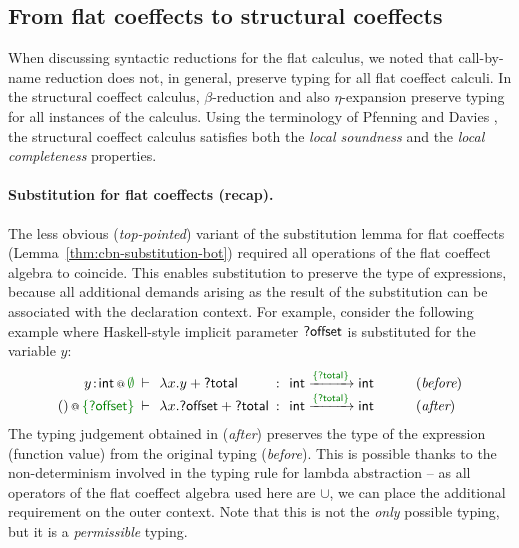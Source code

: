 \subsection{From flat coeffects to structural coeffects}
\label{sec:struct-syntax-intro}

When discussing syntactic reductions for the flat calculus,
we noted that call-by-name reduction does not, in general, preserve typing  for all
flat coeffect calculi. In the structural coeffect calculus, $\beta$-reduction and also $\eta$-expansion
preserve typing for all instances of the calculus. Using the terminology of Pfenning and Davies
\cite{logic-modal-reconstruction}, the structural coeffect calculus satisfies both the \emph{local
soundness} and the \emph{local completeness} properties.

\paragraph{Substitution for flat coeffects (recap).}
The less obvious (\emph{top-pointed}) variant of the substitution lemma for flat coeffects
(Lemma~\ref{thm:cbn-substitution-bot}) required all operations of the flat coeffect algebra
to coincide. This enables substitution to preserve the type of expressions, because all
additional demands arising as the result of the substitution can be associated with the
declaration context. For example, consider the following example where Haskell-style implicit parameter
$\textnormal{\sffamily ?offset}$ is substituted for the variable $y$:
%
\begin{equation*}
\begin{array}{rclcll}
 \coctx{y\!:\!\ident{int}}{\cclrd{\emptyset}} &\narrow{\vdash}& \lambda x.y + \ident{?total} &\narrow{:}&
   \ident{int} \xrightarrow{\cclrd{ \{ \ident{?total} \} }} \ident{int} & \qquad(\textit{before}) \\
\coctx{()}{\cclrd{ \{ \ident{?offset} \} }} &\narrow{\vdash}& \lambda x.\ident{?offset} + \ident{?total} &\narrow{:}&
  \ident{int} \xrightarrow{\cclrd{ \{ \ident{?total} \} }} \ident{int} & \qquad(\textit{after})
\end{array}
\end{equation*}
%
The typing judgement obtained in (\emph{after}) preserves the type of the expression (function
value) from the original typing (\emph{before}). This is possible thanks to the non-determinism
involved in the typing rule for lambda abstraction -- as all operators of the flat coeffect
algebra used here are $\cup$, we can place the additional requirement on the outer context.
Note that this is not the \emph{only} possible typing, but it is a \emph{permissible} typing.

